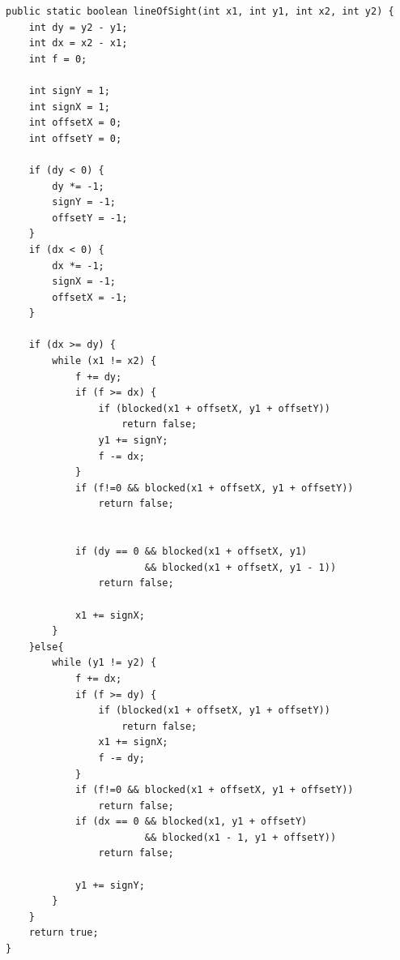 \documentclass[12pt]{book}
\begin{document}
\lstset{style=customjava, caption=Funzione Line Of Sight}
\begin{lstlisting}
public static boolean lineOfSight(int x1, int y1, int x2, int y2) {
    int dy = y2 - y1;
    int dx = x2 - x1;
    int f = 0;

    int signY = 1;
    int signX = 1;
    int offsetX = 0;
    int offsetY = 0;

    if (dy < 0) {
        dy *= -1;
        signY = -1;
        offsetY = -1;
    }
    if (dx < 0) {
        dx *= -1;
        signX = -1;
        offsetX = -1;
    }

    if (dx >= dy) {
        while (x1 != x2) {
            f += dy;
            if (f >= dx) {
                if (blocked(x1 + offsetX, y1 + offsetY))
                    return false;
                y1 += signY;
                f -= dx;
            }
            if (f!=0 && blocked(x1 + offsetX, y1 + offsetY))
                return false;
            
            
            if (dy == 0 && blocked(x1 + offsetX, y1) 
                        && blocked(x1 + offsetX, y1 - 1))
                return false;

            x1 += signX;
        }
    }else{
        while (y1 != y2) {
            f += dx;
            if (f >= dy) {
                if (blocked(x1 + offsetX, y1 + offsetY))
                    return false;
                x1 += signX;
                f -= dy;
            }
            if (f!=0 && blocked(x1 + offsetX, y1 + offsetY))
                return false;
            if (dx == 0 && blocked(x1, y1 + offsetY) 
                        && blocked(x1 - 1, y1 + offsetY))
                return false;

            y1 += signY;
        }
    }
    return true;
}
\end{lstlisting}
\fi
\end{document}
